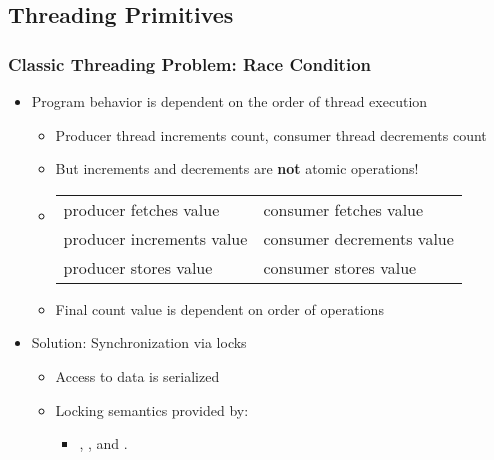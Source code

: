 %
%
%
%

\subsection{Threading Primitives}



\begin{slide}
\frametitle{Classic Threading Problem: Race Condition}

\begin{itemize}
\item Program behavior is dependent on the order of thread execution
  \begin{itemize}
  \item Producer thread increments count, consumer thread decrements count
  \item But increments and decrements are \textbf{not} atomic operations!
    \item [] \vspace{0.5em}
    \begin{tabular}{l|l}
    \footnotesize{producer fetches value} & \footnotesize{consumer fetches value} \\
    \footnotesize{producer increments value} & \footnotesize{consumer decrements value} \\
    \footnotesize{producer stores value} & \footnotesize{consumer stores value} \\
    \end{tabular}
  \item \vspace{0.5em} Final count value is dependent on order of operations
  \end{itemize}

\vspace{1em}
\item Solution: Synchronization via locks
  \begin{itemize}
  \item Access to data is serialized
  \item Locking semantics provided by:
  \begin{itemize}
  \item {}, , and .
  \end{itemize}
  \end{itemize}
\end{itemize}

\end{slide}

